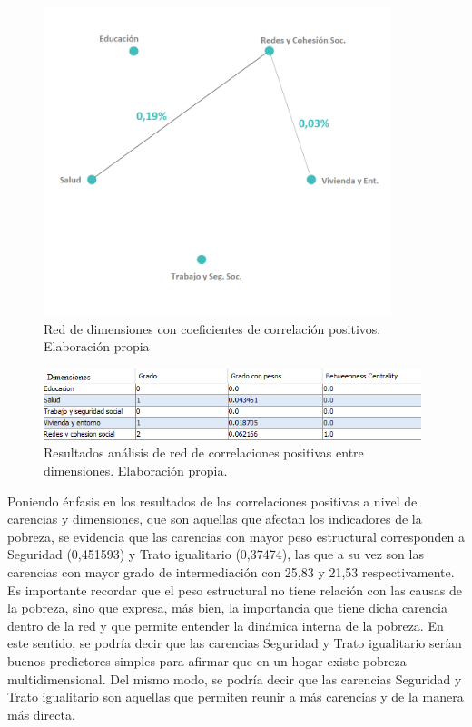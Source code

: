 \documentclass[12pt,letterpaper,spanish]{article}
\begin{document}
\begin{enumerate}
\newpage
\begin{figure}[H]
  \centering
      \includegraphics[height=9cm]{Grafos/GrafoDimensiones.png} 
    \caption{Red de dimensiones con coeficientes de correlación positivos. Elaboración propia}
    \label{grafodimpos}
\end{figure}
\begin{figure}[H]
    \centering
        \includegraphics[width=11cm]{analisis grafos/dimensiones_positivas.png}
    \caption{Resultados análisis de red de correlaciones positivas entre dimensiones. Elaboración propia.}
    \label{analisisDIMPOS}
\end{figure}


Poniendo énfasis en los resultados de las correlaciones positivas a nivel de carencias y dimensiones, que son aquellas que afectan los indicadores de la pobreza, se evidencia que las carencias con mayor peso estructural corresponden a Seguridad (0,451593) y Trato igualitario (0,37474), las que a su vez son las carencias con mayor grado de intermediación con 25,83 y 21,53 respectivamente. Es importante recordar que el peso estructural no tiene relación con las causas de la pobreza, sino que expresa, más bien, la importancia que tiene dicha carencia dentro de la red y que permite entender la dinámica interna de la pobreza. En este sentido, se podría decir que las carencias Seguridad y Trato igualitario serían buenos predictores simples para afirmar que en un hogar existe pobreza multidimensional. Del mismo modo, se podría decir que las carencias Seguridad y Trato igualitario son aquellas que permiten reunir a más carencias y de la manera más directa. 


\end{enumerate}
\end{document}
